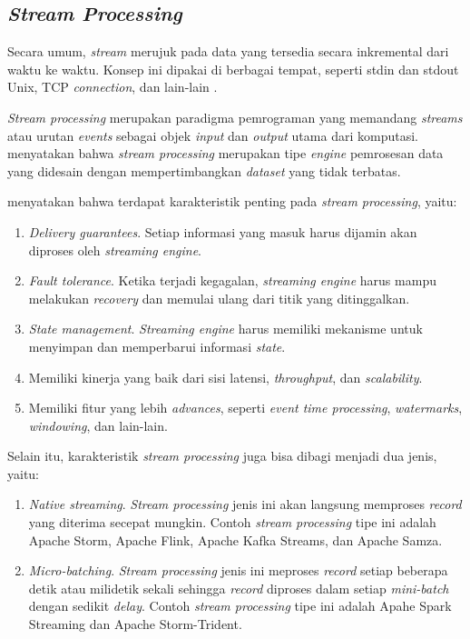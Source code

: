 \subsection{\textit{Stream Processing}}

Secara umum, \textit{stream} merujuk pada data yang tersedia secara inkremental dari waktu ke waktu. Konsep ini dipakai di berbagai tempat, seperti stdin dan stdout Unix, TCP \textit{connection}, dan lain-lain \parencite{dataIntensiveApplications}.

\textit{Stream processing} merupakan paradigma pemrograman yang memandang \textit{streams} atau urutan \textit{events} sebagai objek \textit{input} dan \textit{output} utama dari komputasi. \cite{streaming101} menyatakan bahwa \textit{stream processing} merupakan tipe \textit{engine} pemrosesan data yang didesain dengan mempertimbangkan \textit{dataset} yang tidak terbatas.

\cite{streamProcessingComparison} menyatakan bahwa terdapat karakteristik penting pada \textit{stream processing}, yaitu:

\begin{enumerate}
    \item \textit{Delivery guarantees}. Setiap informasi yang masuk harus dijamin akan diproses oleh \textit{streaming engine}.
    \item \textit{Fault tolerance}. Ketika terjadi kegagalan, \textit{streaming engine} harus mampu melakukan \textit{recovery} dan memulai ulang dari titik yang ditinggalkan.
    \item \textit{State management}. \textit{Streaming engine} harus memiliki mekanisme untuk menyimpan dan memperbarui informasi \textit{state}.
    \item Memiliki kinerja yang baik dari sisi latensi, \textit{throughput}, dan \textit{scalability}.
    \item Memiliki fitur yang lebih \textit{advances}, seperti \textit{event time processing}, \textit{watermarks}, \textit{windowing}, dan lain-lain.
\end{enumerate}

Selain itu, karakteristik \textit{stream processing} juga bisa dibagi menjadi dua jenis, yaitu:

\begin{enumerate}
    \item \textit{Native streaming}. \textit{Stream processing} jenis ini akan langsung memproses \textit{record} yang diterima secepat mungkin. Contoh \textit{stream processing} tipe ini adalah Apache Storm, Apache Flink, Apache Kafka Streams, dan Apache Samza.
    \item \textit{Micro-batching}. \textit{Stream processing} jenis ini meproses \textit{record} setiap beberapa detik atau milidetik sekali sehingga \textit{record} diproses dalam setiap \textit{mini-batch} dengan sedikit \textit{delay}. Contoh \textit{stream processing} tipe ini adalah Apahe Spark Streaming dan Apache Storm-Trident.
\end{enumerate}
